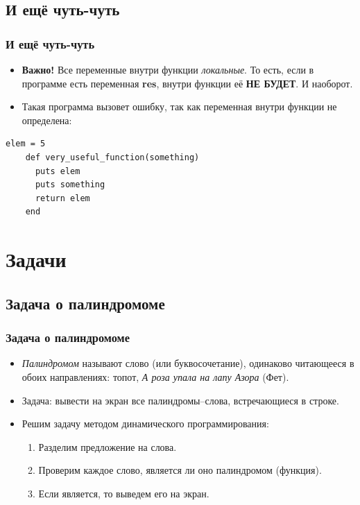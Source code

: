 \documentclass[compress,red]{beamer}
\begin{document}
\subsection{И ещё чуть-чуть}
\begin{frame}[fragile]
  \frametitle{И ещё чуть-чуть}
  \begin{itemize}
    \item \textbf{Важно!} Все переменные внутри функции \emph{локальные}. То есть, если в программе есть переменная \textbf{res}, внутри функции её \textbf{НЕ БУДЕТ}. И наоборот.
    \item Такая программа вызовет ошибку, так как переменная внутри функции не определена:
  \end{itemize}
  \begin{lstlisting}[label=ruby5,caption=Ошибка с локальными переменными]
    elem = 5
    def very_useful_function(something)
      puts elem
      puts something
      return elem
    end
  \end{lstlisting}
\end{frame}

\section{Задачи}
\subsection{Задача о палиндромоме}
\begin{frame}[fragile]
  \frametitle{Задача о палиндромоме}
  \begin{itemize}
    \item \emph{Палиндромом} называют слово (или буквосочетание), одинаково читающееся в обоих направлениях: топот, \emph{А роза упала на лапу Азора} (Фет).
    \item Задача: вывести на экран все палиндромы--слова, встречающиеся в строке.
    \item Решим задачу методом динамического программирования:
      \begin{enumerate}
        \item Разделим предложение на слова.
        \item Проверим каждое слово, является ли оно палиндромом (функция).
        \item Если является, то выведем его на экран.
      \end{enumerate}
  \end{itemize}
\end{frame}
\end{document}
